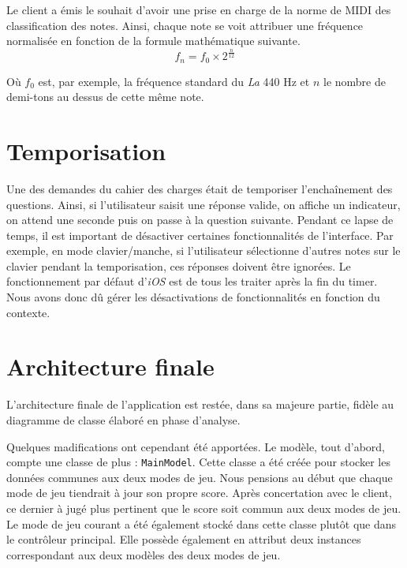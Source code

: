 \documentclass{scrreprt}
\begin{document}
Le client a émis le souhait d'avoir une prise en charge de la norme de MIDI des classification des notes.
Ainsi, chaque note se voit attribuer une fréquence normalisée en fonction de la formule mathématique suivante. 
\[f_{n} = f_{0} \times 2^{\frac{n}{12}}\]

Où $f_{0}$ est, par exemple, la fréquence standard du \textit{La} 440 Hz et $n$ le nombre de demi-tons au dessus de cette même note.
\newline

\section{Temporisation}
Une des demandes du cahier des charges était de temporiser l'enchaînement des questions.
Ainsi, si l'utilisateur saisit une réponse valide, on affiche un indicateur, on attend une seconde puis on passe à la question suivante.
Pendant ce lapse de temps, il est important de désactiver certaines fonctionnalités de l'interface.
Par exemple, en mode clavier/manche, si l'utilisateur sélectionne d'autres notes sur le clavier pendant la temporisation, ces réponses doivent être ignorées.
Le fonctionnement par défaut d'\textit{iOS} est de tous les traiter après la fin du timer. 
Nous avons donc dû gérer les désactivations de fonctionnalités en fonction du contexte.

\section{Architecture finale}%

L'architecture finale de l'application est restée, dans sa majeure partie, fidèle au diagramme de classe élaboré en phase d'analyse.
\newline

Quelques madifications ont cependant été apportées.
Le modèle, tout d'abord, compte une classe de plus : \texttt{MainModel}.
Cette classe a été créée pour stocker les données communes aux deux modes de jeu.
Nous pensions au début que chaque mode de jeu tiendrait à jour son propre score.
Après concertation avec le client, ce dernier à jugé plus pertinent que le score soit commun aux deux modes de jeu.
Le mode de jeu courant a été également stocké dans cette classe plutôt que dans le contrôleur principal.
Elle possède également en attribut deux instances correspondant aux deux modèles des deux modes de jeu.
\newline
\end{document}
